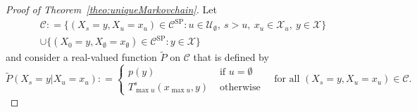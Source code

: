 \documentclass[10pt,a4paper]{paper}
\theoremstyle{definition}
\newcommand{\states}{\mathcal{X}}
\newcommand{\coloneqq}{:\!=}
\begin{document}
\begin{proof}[Proof of Theorem~\ref{theo:uniqueMarkovchain}]
Let
\begin{multline*}
\mathcal{C}\coloneqq\{
(X_s=y,X_u=x_u)\in\mathcal{C}^{\mathrm{SP}}
\colon 
u\in\mathcal{U}_\emptyset,~s>u,~x_u\in\states_u,~y\in\states
\}\\
\cup
\{
(X_0=y,X_\emptyset=x_\emptyset)\in\mathcal{C}^{\mathrm{SP}}\colon y\in\states
\}
\end{multline*}
and consider a real-valued function $\tilde{P}$ on $\mathcal{C}$ that is defined by 
\begin{equation}\label{eq:theo:uniqueMarkovchain:prob_func}
\tilde{P}(X_s=y\vert X_u=x_u)
\coloneqq
\begin{cases}
p(y)&\text{~if $u=\emptyset$}\\
T_{\max u}^s(x_{\max u},y)&\text{~otherwise}
\end{cases}
\text{~~~for all $(X_s=y,X_u=x_u)\in\mathcal{C}$.}
\end{equation}



\end{proof}
\end{document}
